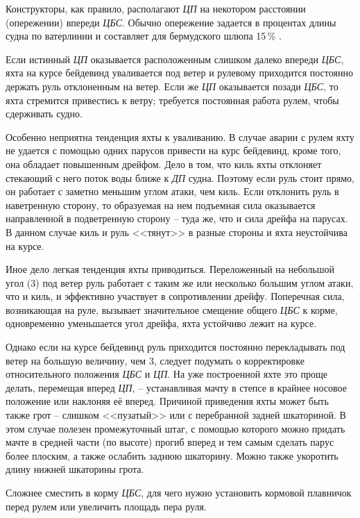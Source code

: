 Конструкторы, как правило, располагают \textit{ЦП} на некотором расстоянии (опережении) впереди \textit{ЦБС}. Обычно опережение задается в процентах длины судна по ватерлинии и составляет для бермудского шлюпа 15\,\% \lkvl.

Если истинный \textit{ЦП} оказывается расположенным слишком далеко впереди \textit{ЦБС}, яхта на курсе бейдевинд уваливается под ветер и рулевому приходится постоянно держать руль отклоненным на ветер. Если же \textit{ЦП} оказывается позади \textit{ЦБС}, то яхта стремится привестись к ветру; требуется постоянная работа рулем, чтобы сдерживать судно. 

Особенно неприятна тенденция яхты к уваливанию. В случае аварии с рулем яхту не удается с помощью одних парусов привести на курс бейдевинд, кроме того, она обладает повышенным дрейфом. Дело в том, что киль яхты отклоняет стекающий с него поток воды ближе к \textit{ДП} судна. Поэтому если руль стоит прямо, он работает с заметно меньшим углом атаки, чем киль. Если отклонить руль в наветренную сторону, то образуемая на нем подъемная сила оказывается направленной в подветренную сторону \--- туда же, что и сила дрейфа на парусах. В данном случае киль и руль <<тянут>> в разные стороны и яхта неустойчива на курсе.

Иное дело легкая тенденция яхты приводиться. Переложенный на небольшой угол (3\gr) под ветер руль работает с таким же или несколько большим углом атаки, что и киль, и эффективно участвует в сопротивлении дрейфу. Поперечная сила, возникающая на руле, вызывает значительное смещение общего \textit{ЦБС} к корме, одновременно уменьшается угол дрейфа, яхта устойчиво лежит на курсе.

Однако если на курсе бейдевинд руль приходится постоянно перекладывать под ветер на большую величину, чем 3\gr, следует подумать о корректировке относительного положения \textit{ЦБС} и \textit{ЦП}. На уже построенной яхте это проще делать, перемещая вперед \textit{ЦП}, \--- устанавливая мачту в степсе в крайнее носовое положение или наклоняя её вперед. Причиной приведения яхты может быть также грот \--- слишком <<пузатый>> или с перебранной задней шкаториной. В этом случае полезен промежуточный штаг, с помощью которого можно придать мачте в средней части (по высоте) прогиб вперед и тем самым сделать парус более плоским, а также ослабить заднюю шкаторину. Можно также укоротить длину нижней шкаторины грота. 

Сложнее сместить в корму \textit{ЦБС}, для чего нужно установить кормовой плавничок перед рулем или увеличить площадь пера руля.

